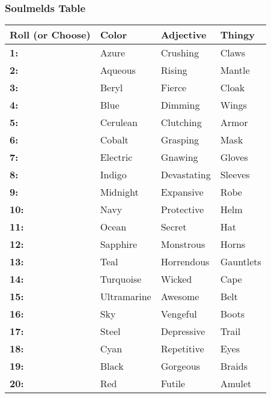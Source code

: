 

\subsubsection*{Soulmelds Table}

\noindent\begin{tabular}[h]{|l|l|l|l|}
\hline
\textbf{Roll (or Choose)}&\textbf{Color}&\textbf{Adjective}&\textbf{Thingy}\\
\hline
\textbf{1:}&Azure&Crushing&Claws\\
\hline
\textbf{2:}&Aqueous&Rising&Mantle\\
\hline
\textbf{3:}&Beryl&Fierce&Cloak\\
\hline
\textbf{4:}&Blue&Dimming&Wings\\
\hline
\textbf{5:}&Cerulean&Clutching&Armor\\
\hline
\textbf{6:}&Cobalt&Grasping&Mask\\
\hline
\textbf{7:}&Electric&Gnawing&Gloves\\
\hline
\textbf{8:}&Indigo&Devastating&Sleeves\\
\hline
\textbf{9:}&Midnight&Expansive&Robe\\
\hline
\textbf{10:}&Navy&Protective&Helm\\
\hline
\textbf{11:}&Ocean&Secret&Hat\\
\hline
\textbf{12:}&Sapphire&Monstrous&Horns\\
\hline
\textbf{13:}&Teal&Horrendous&Gauntlets\\
\hline
\textbf{14:}&Turquoise&Wicked&Cape\\
\hline
\textbf{15:}&Ultramarine&Awesome&Belt\\
\hline
\textbf{16:}&Sky&Vengeful&Boots\\
\hline
\textbf{17:}&Steel&Depressive&Trail\\
\hline
\textbf{18:}&Cyan&Repetitive&Eyes\\
\hline
\textbf{19:}&Black&Gorgeous&Braids\\
\hline
\textbf{20:}&Red&Futile&Amulet\\
\hline
\end{tabular}